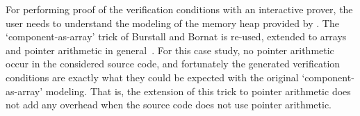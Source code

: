 For performing proof of the verification conditions with an
interactive prover, the user needs to understand the
modeling of the memory heap provided by \caduceus{}. The
`component-as-array' trick of Burstall and Bornat is re-used, extended
to arrays and pointer arithmetic in
general~\cite{filliatre04icfem}. For this case study, no pointer
arithmetic occur in the considered source code, and fortunately the
generated verification conditions are exactly what they could be
expected with the original `component-as-array' modeling. That is, the
extension of this trick to pointer arithmetic does not add any
overhead when the source code does not use pointer arithmetic.

